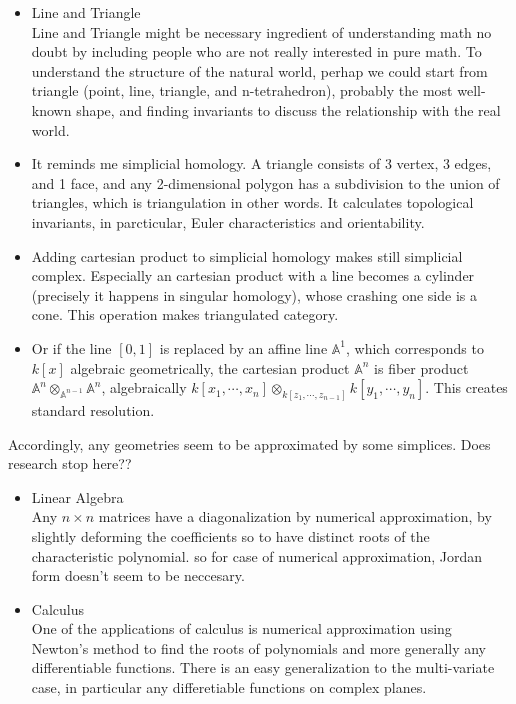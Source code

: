 \documentclass{article}
\begin{document}
\begin{itemize}
\item Line and Triangle \\
Line and Triangle might be necessary ingredient of understanding math no doubt by including people who are not really interested in pure math.
To understand the structure of the natural world,
perhap we could start from triangle (point, line, triangle, and n-tetrahedron), probably the most well-known shape,
and finding invariants to discuss the relationship with the real world. \\


\item It reminds me simplicial homology. A triangle consists of 3 vertex, 3 edges, and 1 face, 
and any 2-dimensional polygon has a subdivision to the union of triangles, which is triangulation in other words.
It calculates topological invariants, in parcticular, Euler characteristics and orientability. \\

\item Adding cartesian product to simplicial homology makes still simplicial complex.
Especially an cartesian product with a line becomes a cylinder (precisely it happens in singular homology), whose crashing one side is a cone.
This operation makes triangulated category. \\

\item Or if the line $[0,1]$ is replaced by an affine line $\mathbb{A}^1$, which corresponds to $k[x]$ algebraic geometrically,
the cartesian product $\mathbb{A}^n$ is fiber product $\mathbb{A}^n \otimes_{\mathbb{A}^{n-1}} \mathbb{A}^n$,
algebraically  $k[x_1,\cdots,x_n] \otimes_{k[z_1,\cdots, z_{n-1}]} k[y_1,\cdots,y_n]$. This creates standard resolution.
\end{itemize}

Accordingly, any geometries seem to be approximated by some simplices.
Does research stop here??

\begin{itemize}
\item Linear Algebra \\
Any $n\times n$ matrices have a diagonalization by numerical approximation,
by slightly deforming the coefficients so to have distinct roots of the characteristic polynomial.
so for case of numerical approximation, Jordan form doesn't seem to be neccesary.

\item Calculus \\
One of the applications of calculus is numerical approximation using Newton's method to find the roots of polynomials 
and more generally any differentiable functions. There is an easy generalization to the multi-variate case, 
in particular any differetiable functions on complex planes.
\end{itemize}
\end{document}
